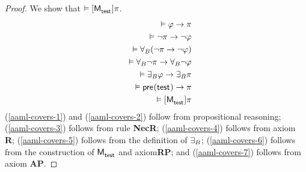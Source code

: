 \begin{proof}
We show that $\entails \actionA{\aPModel{\aStateTest}} \pi$.
\begin{eqnarray}
    && \entails \phi \implies \pi \label{aaml-covers-1}\\
    && \entails \lnot \pi \implies \lnot \phi \label{aaml-covers-2}\\
    && \entails  \allactsBs (\lnot \pi \implies \lnot \phi) \label{aaml-covers-3}\\
    && \entails  \allactsBs \lnot \pi \implies \allactsBs \lnot \phi \label{aaml-covers-4}\\
    && \entails  \someactsBs \phi \implies \someactsBs \pi \label{aaml-covers-5}\\
    && \entails  \aPrecondition(\aStateTest) \implies \pi \label{aaml-covers-6}\\
    && \entails  \actionA{\aPModel{\aStateTest}} \pi \label{aaml-covers-7}
\end{eqnarray}
(\ref{aaml-covers-1}) and
(\ref{aaml-covers-2}) follow from propositional reasoning;
(\ref{aaml-covers-3}) follows from \axiomRamlK{} rule {\bf NecR};
(\ref{aaml-covers-4}) follows from \axiomRamlK{} axiom {\bf R};
(\ref{aaml-covers-5}) follows from the definition of ${\exists_{B}}$;
(\ref{aaml-covers-6}) follows from the construction of $\aPModel{\aStateTest}$ and \axiomRamlK{} axiom{\bf RP}; and
(\ref{aaml-covers-7}) follows from \axiomRamlK{} axiom {\bf AP}.


\end{proof}
